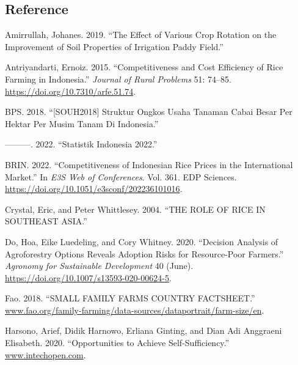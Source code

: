\documentclass[
]{article}
\newlength{\cslhangindent}
\newlength{\cslentryspacingunit} %
\newenvironment{CSLReferences}[2] %
 {%
  \setlength{\parindent}{0pt}
  \ifodd #1
  \let\oldpar\par
  \def\par{\hangindent=\cslhangindent\oldpar}
  \fi
  \setlength{\parskip}{#2\cslentryspacingunit}
 }%
 {}
\begin{document}
\hypertarget{reference}{%
\subsection*{Reference}\label{reference}}

\hypertarget{refs}{}
\begin{CSLReferences}{1}{0}
\leavevmode{}%
Amirrullah, Johanes. 2019. {``The Effect of Various Crop Rotation on the
Improvement of Soil Properties of Irrigation Paddy Field.''}

\leavevmode{}%
Antriyandarti, Ernoiz. 2015. {``Competitiveness and Cost Efficiency of
Rice Farming in Indonesia.''} \emph{Journal of Rural Problems} 51:
74--85. \url{https://doi.org/10.7310/arfe.51.74}.

\leavevmode{}%
BPS. 2018. {``{[}SOUH2018{]} Struktur Ongkos Usaha Tanaman Cabai Besar
Per Hektar Per Musim Tanam Di Indonesia.''}

\leavevmode{}%
---------. 2022. {``Statistik Indonesia 2022.''}

\leavevmode{}%
BRIN. 2022. {``Competitiveness of Indonesian Rice Prices in the
International Market.''} In \emph{E3S Web of Conferences}. Vol. 361. EDP
Sciences. \url{https://doi.org/10.1051/e3sconf/202236101016}.

\leavevmode{}%
Crystal, Eric, and Peter Whittlesey. 2004. {``THE ROLE OF RICE IN
SOUTHEAST ASIA.''}

\leavevmode{}%
Do, Hoa, Eike Luedeling, and Cory Whitney. 2020. {``Decision Analysis of
Agroforestry Options Reveals Adoption Risks for Resource-Poor
Farmers.''} \emph{Agronomy for Sustainable Development} 40 (June).
\url{https://doi.org/10.1007/s13593-020-00624-5}.

\leavevmode{}%
Fao. 2018. {``SMALL FAMILY FARMS COUNTRY FACTSHEET.''}
\href{https://www.fao.org/family-farming/data-sources/dataportrait/farm-size/en}{www.fao.org/family-farming/data-sources/dataportrait/farm-size/en}.

\leavevmode{}%
Harsono, Arief, Didik Harnowo, Erliana Ginting, and Dian Adi Anggraeni
Elisabeth. 2020. {``Opportunities to Achieve Self-Sufficiency.''}
\href{https://www.intechopen.com}{www.intechopen.com}.


\end{CSLReferences}
\end{document}
